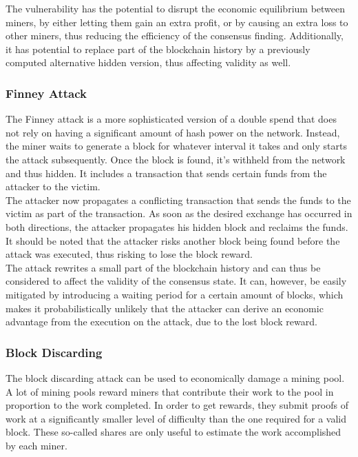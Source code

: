 \documentclass[12pt,a4paper]{article}
\begin{document}
The vulnerability has the potential to disrupt the economic equilibrium between miners, by either letting them gain an extra profit, or by causing an extra loss to other miners, thus reducing the efficiency of the consensus finding. Additionally, it has potential to replace part of the blockchain history by a previously computed alternative hidden version, thus affecting validity as well.\\

\subsubsection{Finney Attack}

The Finney attack is a more sophisticated version of a double spend that does not rely on having a significant amount of hash power on the network. Instead, the miner waits to generate a block for whatever interval it takes and only starts the attack subsequently. Once the block is found, it's withheld from the network and thus hidden. It includes a transaction that sends certain funds from the attacker to the victim.\\

The attacker now propagates a conflicting transaction that sends the funds to the victim as part of the transaction. As soon as the desired exchange has occurred in both directions, the attacker propagates his hidden block and reclaims the funds. It should be noted that the attacker risks another block being found before the attack was executed, thus risking to lose the block reward.\\

The attack rewrites a small part of the blockchain history and can thus be considered to affect the validity of the consensus state. It can, however, be easily mitigated by introducing a waiting period for a certain amount of blocks, which makes it probabilistically unlikely that the attacker can derive an economic advantage from the execution on the attack, due to the lost block reward.\\

\subsubsection{Block Discarding}

The block discarding attack can be used to economically damage a mining pool. A lot of mining pools reward miners that contribute their work to the pool in proportion to the work completed. In order to get rewards, they submit proofs of work at a significantly smaller level of difficulty than the one required for a valid block. These so-called shares are only useful to estimate the work accomplished by each miner.\\
\end{document}
